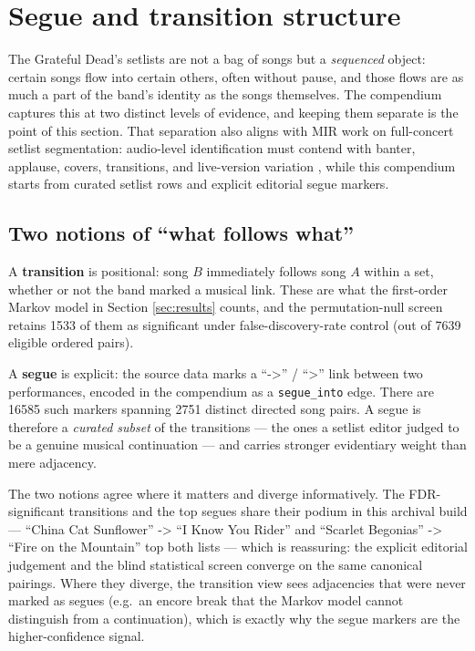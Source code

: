 \documentclass[
]{article}
\begin{document}
\newpage

\section{Segue and transition
structure}\label{segue-and-transition-structure}

\label{sec:segue-structure}

The Grateful Dead's setlists are not a bag of songs but a
\emph{sequenced} object: certain songs flow into certain others, often
without pause, and those flows are as much a part of the band's identity
as the songs themselves. The compendium captures this at two distinct
levels of evidence, and keeping them separate is the point of this
section. That separation also aligns with MIR work on full-concert
setlist segmentation: audio-level identification must contend with
banter, applause, covers, transitions, and live-version variation
\citep{wang_setlist_segmentation}, while this compendium starts from
curated setlist rows and explicit editorial segue markers.

\subsection{Two notions of ``what follows
what''}\label{two-notions-of-what-follows-what}

A \textbf{transition} is positional: song \(B\) immediately follows song
\(A\) within a set, whether or not the band marked a musical link. These
are what the first-order Markov model in Section \ref{sec:results}
counts, and the permutation-null screen retains 1533 of them as
significant under false-discovery-rate control (out of 7639 eligible
ordered pairs).

A \textbf{segue} is explicit: the source data marks a
``-\textgreater{}'' / ``\textgreater{}'' link between two performances,
encoded in the compendium as a \texttt{segue\_into} edge. There are
16585 such markers spanning 2751 distinct directed song pairs. A segue
is therefore a \emph{curated subset} of the transitions --- the ones a
setlist editor judged to be a genuine musical continuation --- and
carries stronger evidentiary weight than mere adjacency.

The two notions agree where it matters and diverge informatively. The
FDR-significant transitions and the top segues share their podium in
this archival build --- ``China Cat Sunflower'' -\textgreater{} ``I Know
You Rider'' and ``Scarlet Begonias'' -\textgreater{} ``Fire on the
Mountain'' top both lists --- which is reassuring: the explicit
editorial judgement and the blind statistical screen converge on the
same canonical pairings. Where they diverge, the transition view sees
adjacencies that were never marked as segues (e.g.~an encore break that
the Markov model cannot distinguish from a continuation), which is
exactly why the segue markers are the higher-confidence signal.
\end{document}
